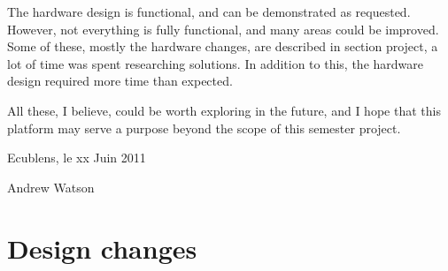 The hardware design is functional, and can be demonstrated as requested.
However, not everything is fully functional, and many areas could be improved.
Some of these, mostly the hardware changes, are described in section
project, a lot of time was spent researching solutions. In addition to this, the
hardware design required more time than expected.

All these, I believe, could be worth exploring in the future, and I hope that
this platform may serve a purpose beyond the scope of this semester project.

\vspace{3cm}
Ecublens, le xx Juin 2011

\vspace{2cm}
Andrew Watson



\pagebreak



\pagebreak
\appendix

\section{Design changes}
\label{sec:design-changes}


